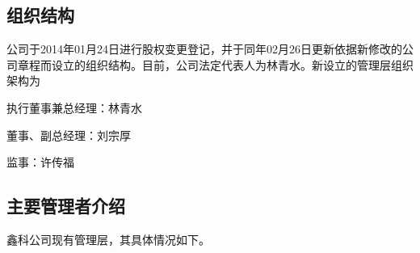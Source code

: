 \subsection{组织结构}
公司于2014年01月24日进行股权变更登记，并于同年02月26日更新依据新修改的公司章程而设立的组织结构。目前，公司法定代表人为林青水。新设立的管理层组织架构为
\begin{compactitem}
\item 执行董事兼总经理：林青水
\item 董事、副总经理：刘宗厚
\item 监事：许传福
\end{compactitem}

\subsection{主要管理者介绍}
鑫科公司现有管理层，其具体情况如下。\\
\vspace{1ex}

